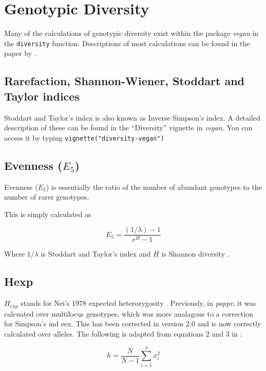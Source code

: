 \documentclass[letterpaper]{article}\usepackage[]{graphicx}\usepackage[]{color}
\newcommand{\poppr}{\textit{poppr}}
\begin{document}
\section{Genotypic Diversity}

Many of the calculations of genotypic diversity exist within the package
\textit{vegan} in the \texttt{diversity} function. Descriptions of most
calculations can be found in the paper by \cite{Grunwald:2003}.

\subsection{Rarefaction, Shannon-Wiener, Stoddart and Taylor indices}

Stoddart and Taylor's index is also known as Inverse Simpson's index. A detailed
description of these can be found in the ``Diversity'' vignette in
\textit{vegan}. You can access it by typing \texttt{vignette("diversity-vegan")}

\subsection{Evenness ($E_{5}$)}
Evenness ($E_{5}$) is essentially the ratio of the number of abundant genotypes
to the number of rarer genotypes.

This is simply calculated as 

\begin{equation}
E_{5} = \frac{(1/\lambda) - 1}{e^{H} - 1}
\end{equation}

Where $1/\lambda$ is Stoddart and Taylor's index and $H$ is Shannon diversity
\citep{Stoddart:1988,Shannon:1948}.

\subsection{Hexp}

$H_{exp}$ stands for Nei's 1978 expected heterozygosity \citep{nei1978estimation}.
Previously, in \poppr{}, it was calcuated over multilocus genotypes, which was
more analagous to a correction for Simpson's ind eex. This has been corrected in
version 2.0 and is now correctly calculated over alleles. The following is 
adapted from equations 2 and 3 in \citep{nei1978estimation}:

\begin{equation}
h = \frac{N}{N-1} \sum_{i = 1}^k{x^{2}_{i}}
\end{equation}
\end{document}
